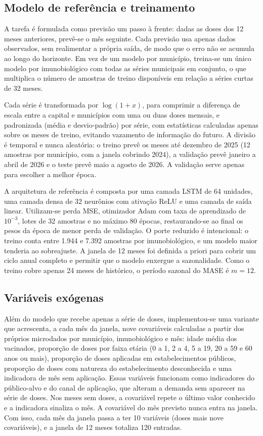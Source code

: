 \documentclass[
    12pt,
    openright,
    oneside,
    a4paper,
    english,
    brazil
]{abntex2}
\begin{document}
\subsection{Modelo de referência e treinamento}
\label{subsec:baseline_config}

A tarefa é formulada como previsão um passo à frente: dadas as doses dos 12 meses anteriores, prevê-se o mês seguinte. Cada previsão usa apenas dados observados, sem realimentar a própria saída, de modo que o erro não se acumula ao longo do horizonte. Em vez de um modelo por município, treina-se um único modelo por imunobiológico com todas as séries municipais em conjunto, o que multiplica o número de amostras de treino disponíveis em relação a séries curtas de 32 meses.

Cada série é transformada por $\log(1+x)$, para comprimir a diferença de escala entre a capital e municípios com uma ou duas doses mensais, e padronizada (média e desvio-padrão) por série, com estatísticas calculadas apenas sobre os meses de treino, evitando vazamento de informação do futuro. A divisão é temporal e nunca aleatória: o treino prevê os meses até dezembro de 2025 (12 amostras por município, com a janela cobrindo 2024), a validação prevê janeiro a abril de 2026 e o teste prevê maio a agosto de 2026. A validação serve apenas para escolher a melhor época.

A arquitetura de referência é composta por uma camada LSTM de 64 unidades, uma camada densa de 32 neurônios com ativação ReLU e uma camada de saída linear. Utilizam-se perda MSE, otimizador Adam com taxa de aprendizado de $10^{-3}$, lotes de 32 amostras e no máximo 80 épocas, restaurando-se ao final os pesos da época de menor perda de validação. O porte reduzido é intencional: o treino conta entre 1.944 e 7.392 amostras por imunobiológico, e um modelo maior tenderia ao sobreajuste. A janela de 12 meses foi definida a priori para cobrir um ciclo anual completo e permitir que o modelo enxergue a sazonalidade. Como o treino cobre apenas 24 meses de histórico, o período sazonal do MASE é $m=12$.

\subsection{Variáveis exógenas}
\label{subsec:exogenas}

Além do modelo que recebe apenas a série de doses, implementou-se uma variante que acrescenta, a cada mês da janela, nove covariáveis calculadas a partir dos próprios microdados por município, imunobiológico e mês: idade média dos vacinados, proporção de doses por faixa etária (0 a 1, 2 a 4, 5 a 19, 20 a 59 e 60 anos ou mais), proporção de doses aplicadas em estabelecimentos públicos, proporção de doses com natureza do estabelecimento desconhecida e uma indicadora de mês sem aplicação. Essas variáveis funcionam como indicadores do público-alvo e do canal de aplicação, que alteram a demanda sem aparecer na série de doses. Nos meses sem doses, a covariável repete o último valor conhecido e a indicadora sinaliza o mês. A covariável do mês previsto nunca entra na janela. Com isso, cada mês da janela passa a ter 10 variáveis (doses mais nove covariáveis), e a janela de 12 meses totaliza 120 entradas.
\end{document}
